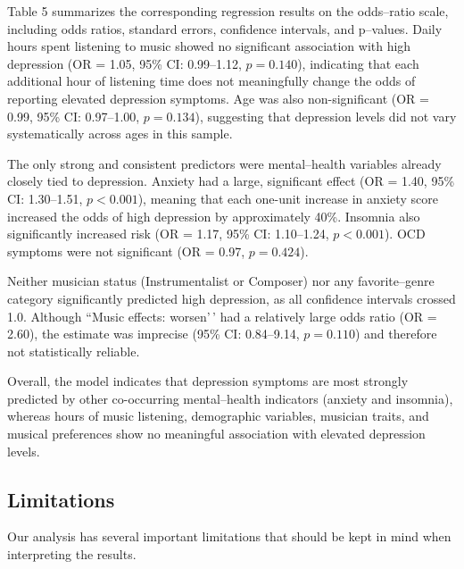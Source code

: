\documentclass[
  letterpaper,
  DIV=11,
  numbers=noendperiod]{scrartcl}
\begin{document}
Table 5 summarizes the corresponding regression results on the
odds--ratio scale, including odds ratios, standard errors, confidence
intervals, and p--values. Daily hours spent listening to music showed no
significant association with high depression (OR = 1.05, 95\% CI:
0.99--1.12, \(p = 0.140\)), indicating that each additional hour of
listening time does not meaningfully change the odds of reporting
elevated depression symptoms. Age was also non-significant (OR = 0.99,
95\% CI: 0.97--1.00, \(p = 0.134\)), suggesting that depression levels
did not vary systematically across ages in this sample.

The only strong and consistent predictors were mental--health variables
already closely tied to depression. Anxiety had a large, significant
effect (OR = 1.40, 95\% CI: 1.30--1.51, \(p < 0.001\)), meaning that
each one-unit increase in anxiety score increased the odds of high
depression by approximately 40\%. Insomnia also significantly increased
risk (OR = 1.17, 95\% CI: 1.10--1.24, \(p < 0.001\)). OCD symptoms were
not significant (OR = 0.97, \(p = 0.424\)).

Neither musician status (Instrumentalist or Composer) nor any
favorite--genre category significantly predicted high depression, as all
confidence intervals crossed 1.0. Although ``Music effects: worsen'\,'
had a relatively large odds ratio (OR = 2.60), the estimate was
imprecise (95\% CI: 0.84--9.14, \(p = 0.110\)) and therefore not
statistically reliable.

Overall, the model indicates that depression symptoms are most strongly
predicted by other co-occurring mental--health indicators (anxiety and
insomnia), whereas hours of music listening, demographic variables,
musician traits, and musical preferences show no meaningful association
with elevated depression levels.

\subsection{Limitations}\label{limitations}

Our analysis has several important limitations that should be kept in
mind when interpreting the results.
\end{document}
